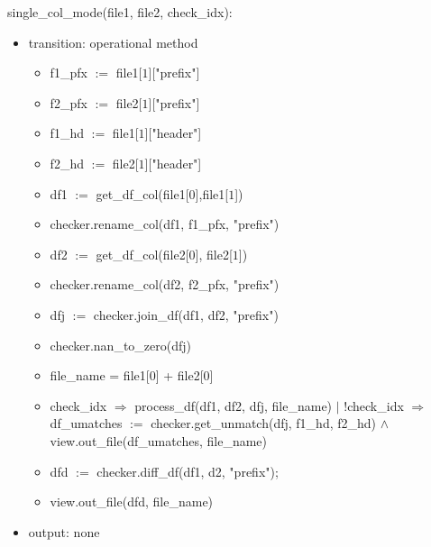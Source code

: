 \documentclass[12pt]{article}
\begin{document}
\noindent single\_col\_mode(file1, file2, check\_idx):
\begin{itemize}
  \item transition: operational method 
  \begin{itemize}[\null]
    \item f1\_pfx $:=$ file1[$1$]["prefix"]
    \item f2\_pfx $:=$ file2[$1$]["prefix"]
    \item f1\_hd $:=$ file1[$1$]["header"]
    \item f2\_hd $:=$ file2[$1$]["header"]
    \item df1 $:=$ get\_df\_col(file1[$0$],file1[$1$])
    \item checker.rename\_col(df1, f1\_pfx, "prefix")
    \item df2 $:=$ get\_df\_col(file2[$0$], file2[$1$])
    \item checker.rename\_col(df2, f2\_pfx, "prefix")
    \item dfj $:=$ checker.join\_df(df1, df2, "prefix")
    \item checker.nan\_to\_zero(dfj)
    \item file\_name = file1[$0$] + file2[$0$]
    \item check\_idx $\Rightarrow$ process\_df(df1, df2, dfj, file\_name) $|$ 
    !check\_idx $\Rightarrow$ df\_umatches $:=$ checker.get\_unmatch(dfj, f1\_hd, f2\_hd) $\wedge$ 
    view.out\_file(df\_umatches, file\_name)
    \item dfd $:=$ checker.diff\_df(df1, d2, "prefix");
    \item view.out\_file(dfd, file\_name)
  \end{itemize}
  \item output: none
\end{itemize}
\end{document}
